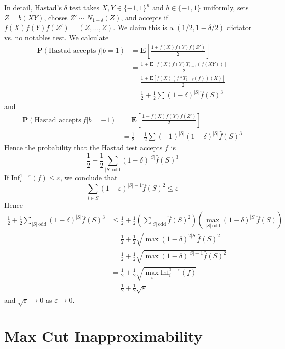 In detail, Hastad's $\delta$ test takes $X,Y \in \{ -1, 1 \}^n$ and $b \in \{ -1, 1 \}$ uniformly, sets $Z = b(XY)$, choses $Z' \sim N_{1 - \delta}(Z)$, and accepts if $f(X)f(Y)f(Z') = (Z,\dots,Z)$. We claim this is a $(1/2, 1 - \delta/2)$ dictator vs. no notables test. We calculate
%
\begin{align*}
    \mathbf{P}(\text{Hastad accepts}\ f | b = 1) &= \mathbf{E} \left[ \frac{1 + f(X)f(Y)f(Z')}{2} \right]\\
    &= \frac{1 + \mathbf{E}[f(X)f(Y) T_{1-\delta}(f(XY))]}{2}\\
    &= \frac{1 + \mathbf{E}[f(X) (f * T_{1 - \delta}(f))(X)]}{2}\\
    &= \frac{1}{2} + \frac{1}{2} \sum (1 - \delta)^{|S|} \widehat{f}(S)^3
\end{align*}
%
and
%
\begin{align*}
    \mathbf{P}(\text{Hastad accepts}\ f | b = -1) &= \mathbf{E} \left[ \frac{1 - f(X)f(Y)f(Z')}{2} \right]\\
    &= \frac{1}{2} - \frac{1}{2} \sum (-1)^{|S|} (1 - \delta)^{|S|} \widehat{f}(S)^3
\end{align*}
%
Hence the probability that the Hastad test accepts $f$ is
%
\[ \frac{1}{2} + \frac{1}{2} \sum_{|S|\ \text{odd}} (1 - \delta)^{|S|} \widehat{f}(S)^3 \]
%
If $\text{Inf}^{1-\varepsilon}_i(f) \leq \varepsilon$, we conclude that
%
\[ \sum_{i \in S} (1 - \varepsilon)^{|S|-1} \widehat{f}(S)^2 \leq \varepsilon \]
%
Hence
%
\begin{align*}
    \frac{1}{2} + \frac{1}{2} \sum_{|S|\ \text{odd}} (1 - \delta)^{|S|} \widehat{f}(S)^3 &\leq \frac{1}{2} + \frac{1}{2} \left( \sum_{|S|\ \text{odd}} \widehat{f}(S)^2 \right) \left( \max_{|S|\ \text{odd}} (1 - \delta)^{|S|} \widehat{f}(S) \right)\\
    &= \frac{1}{2} + \frac{1}{2} \sqrt{ \max (1 - \delta)^{2|S|} \widehat{f}(S)^2 }\\
    &= \frac{1}{2} + \frac{1}{2} \sqrt{ \max (1 - \delta)^{|S| - 1} \widehat{f}(S)^2 }\\
    &= \frac{1}{2} + \frac{1}{2} \sqrt{ \max_i \text{Inf}_i^{1 - \varepsilon}(f) }\\
    &= \frac{1}{2} + \frac{1}{2} \sqrt{\varepsilon}
\end{align*}
%
and $\sqrt{\varepsilon} \to 0$ as $\varepsilon \to 0$.

\section{Max Cut Inapproximability}

